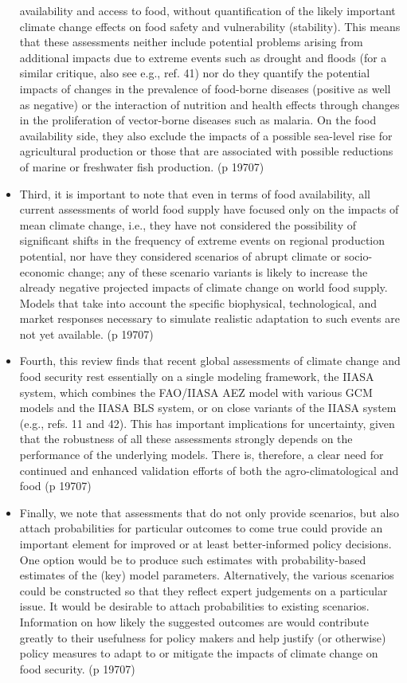 \documentclass[twoside]{article}	%
\begin{document}
\begin{itemize}
availability and access to food, without quantification of the likely important climate change effects on food safety and vulnerability (stability). This means that these assessments neither include potential problems arising from additional impacts due to extreme events such as drought and floods (for a similar critique, also see e.g., ref. 41) nor do they quantify the potential impacts of changes in the prevalence of food-borne diseases (positive as well as negative) or the interaction of nutrition and health effects through changes in the proliferation of vector-borne diseases such as malaria. On the food availability side, they also exclude the impacts of a possible sea-level rise for agricultural production or those that are associated with possible reductions of marine or freshwater fish production. (p 19707)
  \item Third, it is important to note that even in terms of food availability, all current assessments of world food supply have focused only on the impacts of mean climate change, i.e., they have not considered the possibility of significant shifts in the frequency of extreme events on regional production potential, nor have they considered scenarios of abrupt climate or socio-economic change; any of these scenario variants is likely to increase the already negative projected impacts of climate change on world food supply. Models that take into account the specific biophysical, technological, and market responses necessary to simulate realistic adaptation to such events are not yet available. (p 19707)
  \item Fourth, this review finds that recent global assessments of climate change and food security rest essentially on a single modeling framework, the IIASA system, which combines the FAO/IIASA AEZ model with various GCM models and the IIASA BLS system, or on close variants of the IIASA system (e.g., refs. 11 and 42). This has important implications for uncertainty, given that the robustness of all these assessments strongly depends on the performance of the underlying models. There is, therefore, a clear need for continued and enhanced validation efforts of both the agro-climatological and food (p 19707)
  \item Finally, we note that assessments that do not only provide scenarios, but also attach probabilities for particular outcomes to come true could provide an important element for improved or at least better-informed policy decisions. One option would be to produce such estimates with probability-based estimates of the (key) model parameters. Alternatively, the various scenarios could be constructed so that they reflect expert judgements on a particular issue. It would be desirable to attach probabilities to existing scenarios. Information on how likely the suggested outcomes are would contribute greatly to their usefulness for policy makers and help justify (or otherwise) policy measures to adapt to or mitigate the impacts of climate change on food security. (p 19707)

\end{itemize}
\end{document}
